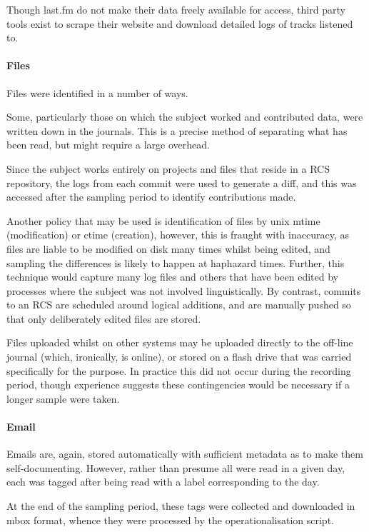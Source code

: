 Though last.fm do not make their data freely available for access, third party tools exist to scrape their website and download detailed logs of tracks listened to.

\paragraph{Files}
Files were identified in a number of ways.

Some, particularly those on which the subject worked and contributed data, were written down in the journals.  This is a precise method of separating what has been read, but might require a large overhead.

Since the subject works entirely on projects and files that reside in a RCS repository, the logs from each commit were used to generate a diff, and this was accessed after the sampling period to identify contributions made.

Another policy that may be used is identification of files by unix mtime (modification) or ctime (creation), however, this is fraught with inaccuracy, as files are liable to be modified on disk many times whilst being edited, and sampling the differences is likely to happen at haphazard times.  Further, this technique would capture many log files and others that have been edited by processes where the subject was not involved linguistically.  By contrast, commits to an RCS are scheduled around logical additions, and are manually pushed so that only deliberately edited files are stored.

Files uploaded whilst on other systems may be uploaded directly to the off-line journal (which, ironically, is online), or stored on a flash drive that was carried specifically for the purpose.  In practice this did not occur during the recording period, though experience suggests these contingencies would be necessary if a longer sample were taken.

\paragraph{Email}
Emails are, again, stored automatically with sufficient metadata as to make them self-documenting.  However, rather than presume all were read in a given day, each was tagged after being read with a label corresponding to the day.

At the end of the sampling period, these tags were collected and downloaded in mbox format, whence they were processed by the operationalisation script.









